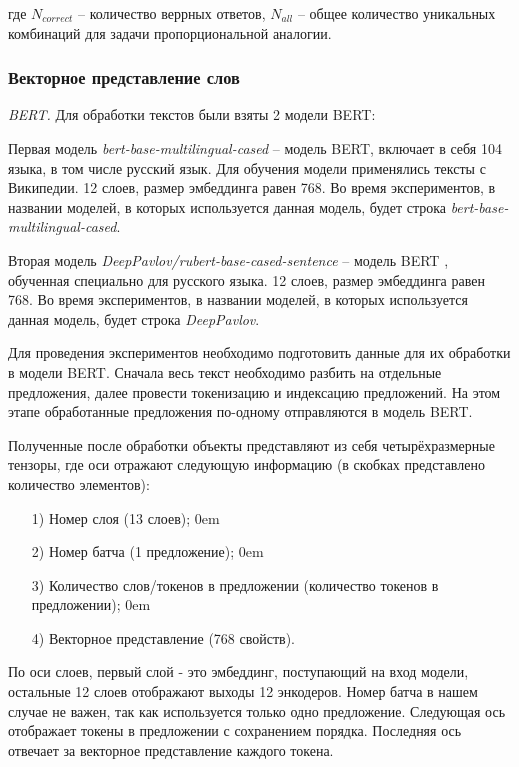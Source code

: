 \documentclass[a4paper,14pt]{article}
\begin{document}
где $N_{correct}$ -- количество веррных ответов, $N_{all}$ -- общее количество уникальных комбинаций для задачи пропорциональной аналогии.

\subsubsection{Векторное представление слов}

\textit{BERT.}
Для обработки текстов были взяты 2 модели BERT:

Первая модель \textit{bert-base-multilingual-cased} -- модель BERT, включает в себя 104 языка, в том числе русский язык.
Для обучения модели применялись тексты с Википедии.
12 слоев, размер эмбеддинга равен 768.
Во время экспериментов, в названии моделей, в которых используется данная модель, будет строка \textit{bert-base-multilingual-cased}.

Вторая модель \textit{DeepPavlov/rubert-base-cased-sentence} -- модель BERT \cite{deep}, обученная специально для русского языка.
12 слоев, размер эмбеддинга равен 768.
Во время экспериментов, в названии моделей, в которых используется данная модель, будет строка \textit{DeepPavlov}.

Для проведения экспериментов необходимо подготовить данные для их обработки в модели BERT.
Сначала весь текст необходимо разбить на отдельные предложения, далее провести токенизацию и индексацию предложений.
На этом этапе обработанные предложения по-одному отправляются в модель BERT.

Полученные после обработки объекты представляют из себя четырёхразмерные тензоры, где оси отражают следующую информацию (в скобках представлено количество элементов):

\begin{enumerate}
		\itemsep0em 
	\item[1)] Номер слоя (13 слоев);
		\itemsep0em 
	\item[2)] Номер батча (1 предложение);
		\itemsep0em 
	\item[3)] Количество слов/токенов в предложении (количество токенов в предложении);
		\itemsep0em 
	\item[4)] Векторное представление (768 свойств).
	
\end{enumerate}	

По оси слоев, первый слой - это эмбеддинг, поступающий на вход модели, остальные 12 слоев отображают выходы 12 энкодеров.
Номер батча в нашем случае не важен, так как используется только одно предложение.
Следующая ось отображает токены в предложении с сохранением порядка.
Последняя ось отвечает за векторное представление каждого токена.
\end{document}
